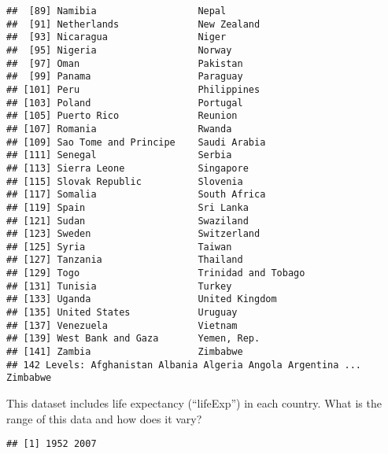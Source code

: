 \documentclass[]{article}
\newenvironment{Shaded}{\begin{snugshade}}{\end{snugshade}}
\newcommand{\KeywordTok}[1]{\textcolor[rgb]{0.13,0.29,0.53}{\textbf{#1}}}
\newcommand{\CommentTok}[1]{\textcolor[rgb]{0.56,0.35,0.01}{\textit{#1}}}
\newcommand{\OperatorTok}[1]{\textcolor[rgb]{0.81,0.36,0.00}{\textbf{#1}}}
\newcommand{\NormalTok}[1]{#1}
\begin{document}
\begin{verbatim}
##  [89] Namibia                  Nepal                   
##  [91] Netherlands              New Zealand             
##  [93] Nicaragua                Niger                   
##  [95] Nigeria                  Norway                  
##  [97] Oman                     Pakistan                
##  [99] Panama                   Paraguay                
## [101] Peru                     Philippines             
## [103] Poland                   Portugal                
## [105] Puerto Rico              Reunion                 
## [107] Romania                  Rwanda                  
## [109] Sao Tome and Principe    Saudi Arabia            
## [111] Senegal                  Serbia                  
## [113] Sierra Leone             Singapore               
## [115] Slovak Republic          Slovenia                
## [117] Somalia                  South Africa            
## [119] Spain                    Sri Lanka               
## [121] Sudan                    Swaziland               
## [123] Sweden                   Switzerland             
## [125] Syria                    Taiwan                  
## [127] Tanzania                 Thailand                
## [129] Togo                     Trinidad and Tobago     
## [131] Tunisia                  Turkey                  
## [133] Uganda                   United Kingdom          
## [135] United States            Uruguay                 
## [137] Venezuela                Vietnam                 
## [139] West Bank and Gaza       Yemen, Rep.             
## [141] Zambia                   Zimbabwe                
## 142 Levels: Afghanistan Albania Algeria Angola Argentina ... Zimbabwe
\end{verbatim}

This dataset includes life expectancy (``lifeExp'') in each country.
What is the range of this data and how does it vary?

\begin{Shaded}
\end{Shaded}

\begin{verbatim}
## [1] 1952 2007
\end{verbatim}

\begin{Shaded}
\end{Shaded}
\end{document}
